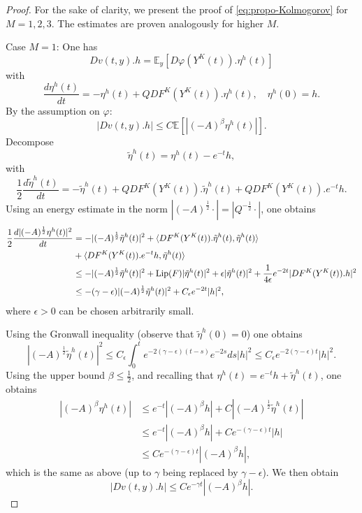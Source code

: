 \documentclass[11pt]{amsart}
\newcommand{\E}{\mathbb{E}}
\begin{document}
\begin{proof}
For the sake of clarity, we present the proof of \eqref{eq:propo-Kolmogorov} for $M=1,2,3$. The estimates are proven analogously for higher $M$.
\smallskip

\noindent
Case $M=1$:
One has
\[
Dv(t,y).h=\E_y[D\varphi(Y^K(t)).\eta^h(t)]
\]
with
\[
\frac{d\eta^h(t)}{dt}=-\eta^h(t)+QDF^K(Y^K(t)).\eta^h(t),\quad \eta^h(0)=h.
\]
By the assumption on $\varphi$:
\[
|Dv(t,y).h|\le C\E[|(-A)^{\beta}\eta^h(t)|].
\]
Decompose
\[
\tilde{\eta}^h(t)=\eta^h(t)-e^{-t}h,
\]
with
\[
\frac12\frac{d\tilde{\eta}^h(t)}{dt}=-\tilde{\eta}^h(t)+QDF^K(Y^K(t)).\tilde{\eta}^h(t)+QDF^K(Y^K(t)).e^{-t}h.
\]
Using an energy estimate in the norm $|(-A)^{\frac12}\cdot|=|Q^{-\frac12}\cdot|$, one obtains
\begin{align*}
\frac12\frac{d|(-A)^{\frac12}\eta^h(t)|^2}{dt}&=-|(-A)^{\frac12}\tilde{\eta}^h(t)|^2+\langle DF^K(Y^K(t)).\tilde{\eta}^h(t),\tilde{\eta}^h(t)\rangle\\
&+\langle DF^K(Y^K(t)).e^{-t}h,\tilde{\eta}^h(t)\rangle\\
&\le -|(-A)^{\frac12}\tilde{\eta}^h(t)|^2+{\rm Lip}(F)|\tilde{\eta}^h(t)|^2+\epsilon|\tilde{\eta}^h(t)|^2+\frac{1}{4\epsilon}e^{-2t}|DF^K(Y^K(t)).h|^2\\
&\le -(\gamma-\epsilon)|(-A)^{\frac12}\tilde{\eta}^h(t)|^2+C_\epsilon e^{-2t}|h|^2,
\end{align*}
where $\epsilon>0$ can be chosen arbitrarily small.

Using the Gronwall inequality (observe that $\tilde{\eta}^h(0)=0$) one obtains
\[
|(-A)^{\frac12}\tilde{\eta}^h(t)|^2\le C_\epsilon \int_0^t e^{-2(\gamma-\epsilon)(t-s)}e^{-2s}ds|h|^2\le C_\epsilon e^{-2(\gamma-\epsilon)t}|h|^2.
\]
Using the upper bound $\beta\le \frac12$, and recalling that $\eta^h(t)=e^{-t}h+\tilde{\eta}^h(t)$, one obtains
\begin{align*}
|(-A)^{\beta}\eta^h(t)|&\le e^{-t}|(-A)^{\beta}h|+C|(-A)^{\frac12}\tilde{\eta}^h(t)|\\
&\le e^{-t}|(-A)^{\beta}h|+Ce^{-(\gamma-\epsilon)t}|h|\\
&\le Ce^{-(\gamma-\epsilon)t}|(-A)^{\beta}h|,
\end{align*}
which is the same as above (up to $\gamma$ being replaced by $\gamma-\epsilon$).
We then obtain
\[
|Dv(t,y).h|\le Ce^{-\gamma t}|(-A)^{\beta}h|.
\]
\smallskip


\end{proof}
\end{document}
